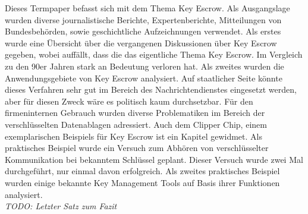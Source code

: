 Dieses Termpaper befasst sich mit dem Thema Key Escrow. Als Ausgangslage wurden diverse journalistische Berichte, Expertenberichte, Mitteilungen von Bundesbehörden, sowie geschichtliche Aufzeichnungen verwendet. Als erstes wurde eine Übersicht über die vergangenen Diskussionen über Key Escrow gegeben, wobei auffällt, dass die das eigentliche Thema Key Escrow. Im Vergleich zu den 90er Jahren stark an Bedeutung verloren hat. Als zweites wurden die Anwendungsgebiete von Key Escrow analysiert. Auf staatlicher Seite könnte dieses Verfahren sehr gut im Bereich des Nachrichtendienstes eingesetzt werden, aber für diesen Zweck wäre es politisch kaum durchsetzbar. Für den firmeninternen Gebrauch wurden diverse Problematiken im Bereich der verschlüsselten Datenablagen adressiert. Auch dem Clipper Chip, einem exemplarischen Beispiels für Key Escrow ist ein Kapitel gewidmet. Als praktisches Beispiel wurde ein Versuch zum Abhören von verschlüsselter Kommunikation bei bekanntem Schlüssel geplant. Dieser Versuch wurde zwei Mal durchgeführt, nur einmal davon erfolgreich. Als zweites praktisches Beispiel wurden einige bekannte Key Management Tools auf Basis ihrer Funktionen analysiert.
\\ \large{\textit{TODO: Letzter Satz zum Fazit}}